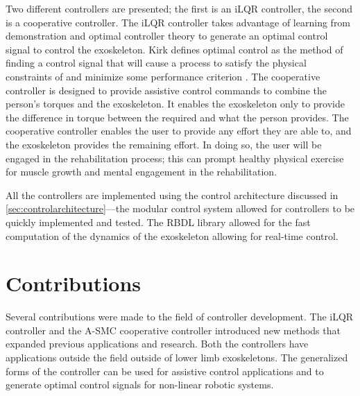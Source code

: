 Two different controllers are presented; the first is an iLQR controller, the second is a cooperative controller. The iLQR controller takes advantage of learning from demonstration and optimal controller theory to generate an optimal control signal to control the exoskeleton. Kirk defines optimal control as the method of finding a control signal that will cause a process to satisfy the physical constraints of and minimize some performance criterion \cite{kirk2004optimal}. The cooperative controller is designed to provide assistive control commands to combine the person's torques and the exoskeleton. It enables the exoskeleton only to provide the difference in torque between the required and what the person provides. The cooperative controller enables the user to provide any effort they are able to, and the exoskeleton provides the remaining effort. In doing so, the user will be engaged in the rehabilitation process; this can prompt healthy physical exercise for muscle growth and mental engagement in the rehabilitation.   

All the controllers are implemented using the control architecture discussed in \autoref{sec:controlarchitecture}—the modular control system allowed for controllers to be quickly implemented and tested. The RBDL library allowed for the fast computation of the dynamics of the exoskeleton allowing for real-time control. 







\section{Contributions}

Several contributions were made to the field of controller development. The iLQR controller and the A-SMC cooperative controller introduced new methods that expanded previous applications and research. Both the controllers have applications outside the field outside of lower limb exoskeletons. The generalized forms of the controller can be used for assistive control applications and to generate optimal control signals for non-linear robotic systems. 



